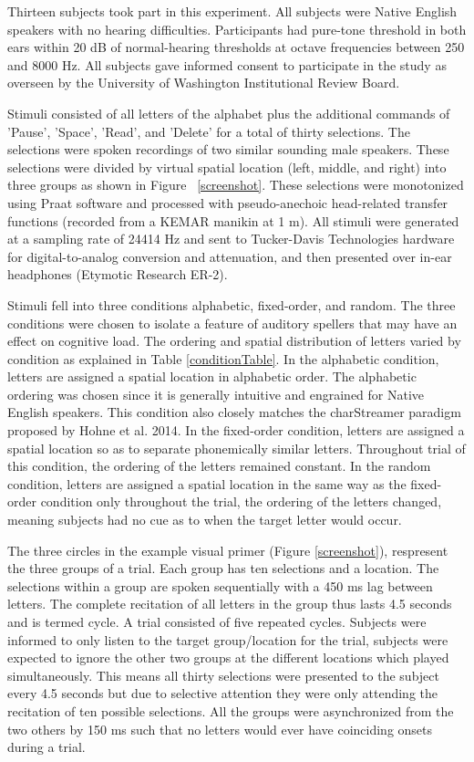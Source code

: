 \documentclass[10pt]{article}
\begin{document}
Thirteen subjects took part in this experiment.  All subjects were
Native English speakers with no hearing difficulties.  Participants
had pure-tone threshold in both ears within 20 dB of normal-hearing
thresholds at octave frequencies between 250 and 8000 Hz.  All
subjects gave informed consent to participate in the study as
overseen by the University of Washington Institutional Review Board.

Stimuli consisted of all letters of the alphabet plus the additional
commands of 'Pause', 'Space', 'Read', and 'Delete' for a total of
thirty selections. The selections were spoken recordings of two
similar sounding male speakers.  These selections were divided by
virtual spatial location (left, middle, and right) into three groups
as shown in Figure ~\ref{screenshot}.  These selections were
monotonized using Praat software and processed with pseudo-anechoic
head-related transfer functions (recorded from a KEMAR manikin at 1
m).  All stimuli were generated at a sampling rate of 24414 Hz and
sent to Tucker-Davis Technologies hardware for digital-to-analog
conversion and attenuation, and then presented over in-ear
headphones (Etymotic Research ER-2).

Stimuli fell into three conditions alphabetic, fixed-order, and
random.  The three conditions were chosen to isolate a feature of
auditory spellers that may have an effect on cognitive load.  The
ordering and spatial distribution of letters varied by condition as
explained in Table \ref{conditionTable}.  In the alphabetic
condition, letters are assigned a spatial location in alphabetic
order.  The alphabetic ordering was chosen since it is generally
intuitive and engrained for Native English speakers.  This condition
also closely matches the charStreamer paradigm proposed by Hohne et
al.  2014\cite{Hohne2014}.  In the fixed-order condition, letters
are assigned a spatial location so as to separate phonemically
similar letters.  Throughout trial of this condition, the ordering
of the letters remained constant.  In the random condition, letters
are assigned a spatial location in the same way as the fixed-order
condition only throughout the trial, the ordering of the letters
changed, meaning subjects had no cue as to when the target letter
would occur. 

The three circles in the example visual primer (Figure
\ref{screenshot}), respresent the three groups of a trial.  Each
group has ten selections and a location.  The selections within a
group are spoken sequentially with a 450 ms lag between letters.
The complete recitation of all letters in the group thus lasts 4.5
seconds and is termed cycle.  A trial consisted of five repeated
cycles. Subjects were informed to only listen to the target
group/location for the trial, subjects were expected to ignore the
other two groups at the different locations which played
simultaneously. This means all thirty selections were presented to
the subject every 4.5 seconds but due to selective attention they
were only attending the recitation of ten possible selections. All
the groups were asynchronized from the two others by 150 ms such
that no letters would ever have coinciding onsets during a trial.
\end{document}
